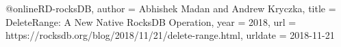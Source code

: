 

@online{RD-rocksDB,
  author = {Abhishek Madan and Andrew Kryczka},
  title = {DeleteRange: A New Native RocksDB Operation},
  year = 2018,
  url = {https://rocksdb.org/blog/2018/11/21/delete-range.html},
  urldate = {2018-11-21}
}


